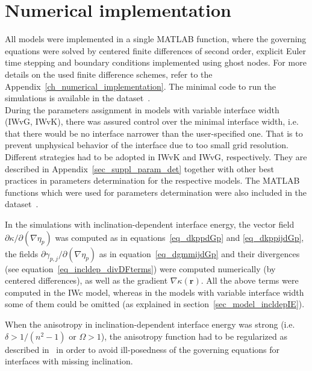 \section{Numerical implementation}
All models were implemented in a single MATLAB function, where the governing equations were solved by centered finite differences of second order, explicit Euler time stepping and boundary conditions implemented using ghost nodes. For more details on the used finite difference schemes, refer to the Appendix~\ref{ch_numerical_implementation}. The minimal code to run the simulations is available in the dataset~\cite{Minar2022dataset}. \\
During the parameters assignment in models with variable interface width (IWvG, IWvK), there was assured control over the minimal interface width, i.e. that there would be no interface narrower than the user-specified one. That is to prevent unphysical behavior of the interface due to too small grid resolution. Different strategies had to be adopted in IWvK and IWvG, respectively. They are described in Appendix~\ref{sec_suppl_param_det} together with other best practices in parameters determination for the respective models. The MATLAB functions which were used for parameters determination were also included in the dataset~\cite{Minar2022dataset}.

In the simulations with inclination-dependent interface energy, the vector field $\partial \kappa/\partial(\nabla\eta_p)$ was computed as in equations~\eqref{eq_dkppdGp} and \eqref{eq_dkppijdGp}, the fields $\partial \gamma_{p,j}/\partial(\nabla\eta_p)$ as in equation~\eqref{eq_dgmmijdGp} and their divergences (see equation~\eqref{eq_incldep_divDFterms}) were computed numerically (by centered differences), as well as the gradient $\nabla\kappa(\bm{r})$. All the above terms were computed in the IWc model, whereas in the models with variable interface width some of them could be omitted (as explained in section~\ref{sec_model_incldepIE}).

When the anisotropy in inclination-dependent interface energy was strong (i.e. $\delta>1/(n^2-1)$ or $\Omega>1$), the anisotropy function had to be regularized as described in~\cite{Eggleston2001} in order to avoid ill-posedness of the governing equations for interfaces with missing inclination.


